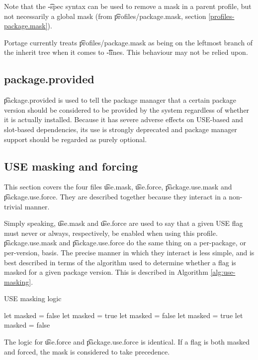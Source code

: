 Note that the \t{-spec} syntax can be used to remove a mask in a parent profile, but not
necessarily a global mask (from \t{profiles/package.mask}, section \ref{profiles-package.mask}).

\note Portage currently treats \t{profiles/package.mask} as being on the leftmost branch of the
    inherit tree when it comes to \t{-lines}. This behaviour may not be relied upon.

\subsection{package.provided}
\t{package.provided} is used to tell the package manager that a certain package version should be
considered to be provided by the system regardless of whether it is actually installed. Because it
has severe adverse effects on USE-based and slot-based dependencies, its use is strongly deprecated
and package manager support should be regarded as purely optional.

\subsection{USE masking and forcing}
\label{use-masking}
This section covers the four files \t{use.mask}, \t{use.force}, \t{package.use.mask} and
\t{package.use.force}. They are described together because they interact in a non-trivial manner.

Simply speaking, \t{use.mask} and \t{use.force} are used to say that a given USE flag must never or
always, respectively, be enabled when using this profile. \t{package.use.mask} and
\t{package.use.force} do the same thing on a per-package, or per-version, basis. The precise manner
in which they interact is less simple, and is best described in terms of the algorithm used to
determine whether a flag is masked for a given package version. This is described in Algorithm
\ref{alg:use-masking}.
\begin{algorithm}
\caption{USE masking logic} \label{alg:use-masking}
\begin{algorithmic}[1]
\STATE let masked = false
        \STATE let masked = true
        \STATE let masked = false
    \ENDIF
            \STATE let masked = true
            \STATE let masked = false
        \ENDIF
    \ENDFOR
\ENDFOR
\end{algorithmic}
\end{algorithm}

The logic for \t{use.force} and \t{package.use.force} is identical. If a flag is both masked and
forced, the mask is considered to take precedence.



